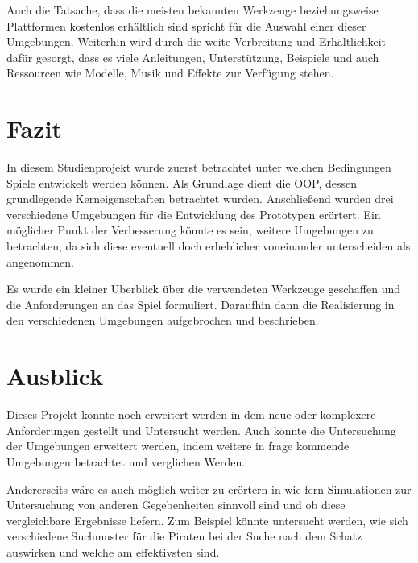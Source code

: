 \documentclass[
	12pt, %
	a4paper,
	listof=totoc, %
	bibliography=totoc, %
	numbers=noenddot, %
	ngerman, %
	headsepline, %
	oneside %
	]{scrbook} %
\begin{document}
{Auch die Tatsache, dass die meisten bekannten Werkzeuge beziehungsweise Plattformen kostenlos erhältlich sind spricht für die Auswahl einer dieser Umgebungen. Weiterhin wird durch die weite Verbreitung und Erhältlichkeit dafür gesorgt, dass es viele Anleitungen, Unterstützung, Beispiele und auch Ressourcen wie Modelle, Musik und Effekte zur Verfügung stehen.

\chapter{Fazit}
In diesem Studienprojekt wurde zuerst betrachtet unter welchen Bedingungen Spiele entwickelt werden können. Als Grundlage dient die \gls{OOP}, dessen grundlegende Kerneigenschaften betrachtet wurden.
Anschließend wurden drei verschiedene Umgebungen für die Entwicklung des Prototypen erörtert.  
Ein möglicher Punkt der Verbesserung könnte es sein, weitere Umgebungen zu betrachten, da sich diese eventuell doch erheblicher voneinander unterscheiden als angenommen.  
  
Es wurde ein kleiner Überblick über die verwendeten Werkzeuge geschaffen und die Anforderungen an das Spiel formuliert. Daraufhin dann die Realisierung in den verschiedenen Umgebungen aufgebrochen und beschrieben.


\chapter{Ausblick}
Dieses Projekt könnte noch erweitert werden in dem neue oder komplexere Anforderungen gestellt und Untersucht werden. Auch könnte die Untersuchung der Umgebungen erweitert werden, indem weitere in frage kommende Umgebungen betrachtet und verglichen Werden.  
  
Andererseits wäre es auch möglich weiter zu erörtern in wie fern Simulationen zur Untersuchung von anderen Gegebenheiten sinnvoll sind und ob diese vergleichbare Ergebnisse liefern. Zum Beispiel könnte untersucht werden, wie sich verschiedene Suchmuster für die Piraten bei der Suche nach dem Schatz auswirken und welche am effektivsten sind.



}
\end{document}
